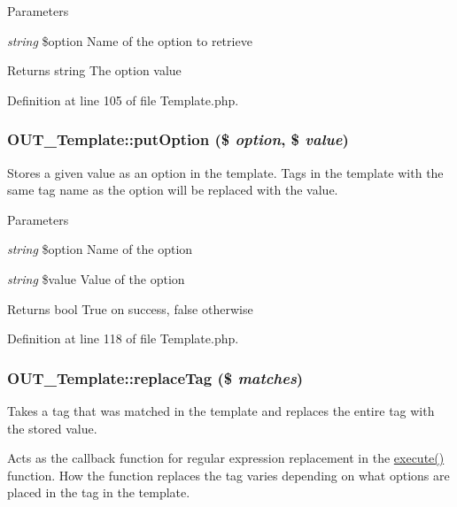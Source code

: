 \begin{DoxyParams}{Parameters}
\item[{\em string}]\$option Name of the option to retrieve\end{DoxyParams}
\begin{DoxyReturn}{Returns}
string The option value 
\end{DoxyReturn}


Definition at line 105 of file Template.php.\hypertarget{classOUT__Template_a068a09ea40b27447cbf3cd4540939a8e}{
\subsubsection[{putOption}]{\setlength{\rightskip}{0pt plus 5cm}OUT\_\-Template::putOption (\$ {\em option}, \/  \$ {\em value})}}
\label{d0/dcf/classOUT__Template_a068a09ea40b27447cbf3cd4540939a8e}
Stores a given value as an option in the template. Tags in the template with the same tag name as the option will be replaced with the value.


\begin{DoxyParams}{Parameters}
\item[{\em string}]\$option Name of the option \item[{\em string}]\$value Value of the option\end{DoxyParams}
\begin{DoxyReturn}{Returns}
bool True on success, false otherwise 
\end{DoxyReturn}


Definition at line 118 of file Template.php.\hypertarget{classOUT__Template_a851f1584ccf3a08203c13b89b9b18c95}{
\subsubsection[{replaceTag}]{\setlength{\rightskip}{0pt plus 5cm}OUT\_\-Template::replaceTag (\$ {\em matches})}}
\label{d0/dcf/classOUT__Template_a851f1584ccf3a08203c13b89b9b18c95}
Takes a tag that was matched in the template and replaces the entire tag with the stored value.

Acts as the callback function for regular expression replacement in the \hyperlink{classOUT__Template_a87d9c155f0467841a0ce3a61c6131f5e}{execute()} function. How the function replaces the tag varies depending on what options are placed in the tag in the template.


